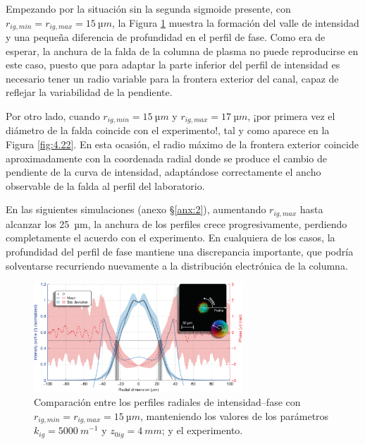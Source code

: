 Empezando por la situación sin la segunda sigmoide presente, con $r_{ig,min}=r_{ig,max}=\qty{15}{µm}$, la Figura \ref{fig:4.21} muestra la formación del valle de intensidad y una pequeña diferencia de profundidad en el perfil de fase. Como era de esperar, la anchura de la falda de la columna de plasma no puede reproducirse en este caso, puesto que para adaptar la parte inferior del perfil de intensidad es necesario tener un radio variable para la frontera exterior del canal, capaz de reflejar la variabilidad de la pendiente.

Por otro lado, cuando $r_{ig,min}=\qty{15}{µm}$ y $r_{ig,max}=\qty{17}{µm}$, ¡por primera vez el diámetro de la falda coincide con el experimento!, tal y como aparece en la Figura \ref{fig:4.22}. En esta ocasión, el radio máximo de la frontera exterior coincide aproximadamente con la coordenada radial donde se produce el cambio de pendiente de la curva de intensidad, adaptándose correctamente el ancho observable de la falda al perfil del laboratorio.

En las siguientes simulaciones (anexo \S\ref{anx:2}), aumentando $r_{ig,max}$ hasta alcanzar los \qty{25}{µm}, la anchura de los perfiles crece progresivamente, perdiendo completamente el acuerdo con el experimento. En cualquiera de los casos, la profundidad del perfil de fase mantiene una discrepancia importante, que podría solventarse recurriendo nuevamente a la distribución electrónica de la columna. 

\begin{figure}[htbp]
  \centering
  \includegraphics[width=0.7\textwidth]{Figuras/ch4_cmp41.png}
  \caption{Comparación entre los perfiles radiales de intensidad--fase con $r_{ig,min}=r_{ig,max}=\qty{15}{µm}$, manteniendo los valores de los parámetros $k_{ig}=\qty{5000}{m^{-1}}$ y $z_{0ig}=\qty{4}{mm}$; y el experimento.}
  \label{fig:4.21}
\end{figure}

